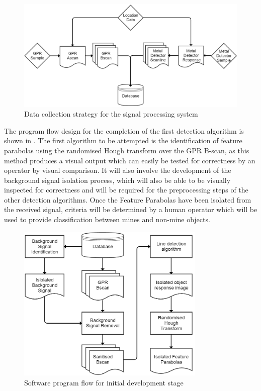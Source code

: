 \documentclass[main.tex]{subfiles}
\begin{document}
\begin{figure}[ht]
\includegraphics[width=\textwidth]{5-DetailedDesign/data-management.png}
\centering
\caption{Data collection strategy for the signal processing system}
\end{figure}

The program flow design for the completion of the first detection algorithm is shown in . The first algorithm to be attempted is the identification of feature parabolas using the randomised Hough transform over the GPR B-scan, as this method produces a visual output which can easily be tested for correctness by an operator by visual comparison. It will also involve the development of the background signal isolation process, which will also be able to be visually inspected for correctness and will be required for the preprocessing steps of the other detection algorithms.
Once the Feature Parabolas have been isolated from the received signal, criteria will be determined by a human operator which will be used to provide classification between mines and non-mine objects.

\begin{figure}[ht]
\includegraphics[width=0.8\textwidth]{5-DetailedDesign/agile-strategy.png}
\centering
\caption{Software program flow for initial development stage}
\end{figure}
\end{document}
